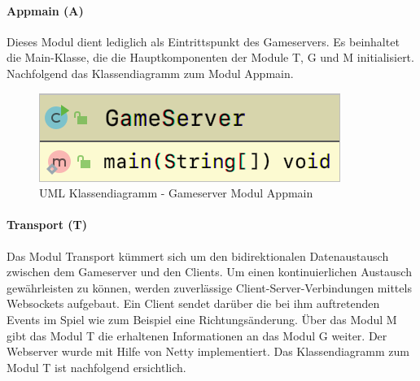\documentclass[11pt,ngerman]{article}
\begin{document}
	\paragraph{Appmain (A)}
	Dieses Modul dient lediglich als Eintrittspunkt des Gameservers. Es beinhaltet die Main-Klasse, die die Hauptkomponenten der Module T, G und M initialisiert. Nachfolgend das Klassendiagramm zum Modul Appmain.

	\begin{figure}[H]
    	\centering
    	\includegraphics[scale=0.4]{figures/gameserver-uml/appmain-classes.png}
    	\caption{UML Klassendiagramm - Gameserver Modul Appmain}
    	\label{fig:UMLModulAppmain}
    \end{figure}

    \paragraph{Transport (T)}

	Das Modul Transport kümmert sich um den bidirektionalen Datenaustausch zwischen dem Gameserver und den Clients. Um einen kontinuierlichen Austausch gewährleisten zu können, werden zuverlässige Client-Server-Verbindungen mittels \Gls{Websocket}s aufgebaut. Ein Client sendet darüber die bei ihm auftretenden Events im Spiel wie zum Beispiel eine Richtungsänderung. Über das Modul M gibt das Modul T die erhaltenen Informationen an das Modul G weiter. Der Webserver wurde mit Hilfe von \Gls{Netty} implementiert. Das Klassendiagramm zum Modul T ist nachfolgend ersichtlich.
\end{document}
